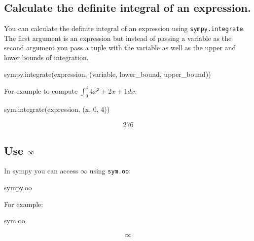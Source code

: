 \subsection{Calculate the definite integral of an expression.}

You can calculate the definite integral of an expression using
\texttt{sympy.integrate}. The first argument is an expression but instead of passing a
variable as the second argument you pass a tuple with the variable as well as the upper
and lower bounds of integration.


\begin{api}
sympy.integrate(expression, (variable, lower_bound, upper_bound))
\end{api}



For example to compute \(\int_0^4 4x^3 + 2x + 1 dx\):




\begin{pyin}
sym.integrate(expression, (x, 0, 4))
\end{pyin}




\begin{equation*}
\begin{split}\displaystyle 276\end{split}
\end{equation*}




\subsection{Use \(\infty\protect\)}
\label{\detokenize{tools-for-mathematics/03-calculus/how/main:use-infty}}

In sympy you can access \(\infty\) using \texttt{sym.oo}:


\begin{api}
sympy.oo
\end{api}



For example:




\begin{pyin}
sym.oo
\end{pyin}




\begin{equation*}
\begin{split}\displaystyle \infty\end{split}
\end{equation*}




